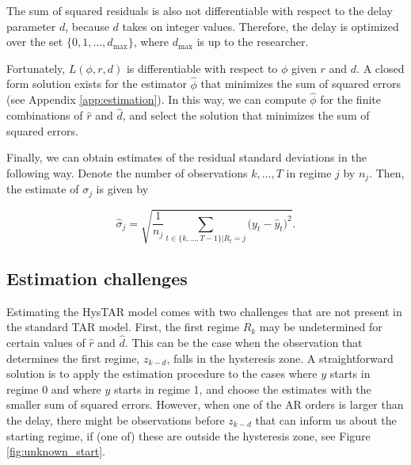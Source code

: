 \documentclass{article}
\begin{document}
The sum of squared residuals is also not differentiable with respect to the delay parameter $d$, because $d$ takes on integer values. Therefore, the delay is optimized over the set $\{0, 1, \dots, d_{\max}\}$, where $d_{\max}$ is up to the researcher.

Fortunately, $L(\phi, r, d)$ is differentiable with respect to $\phi$ given $r$ and $d$. A closed form solution exists for the estimator $\hat{\phi}$ that minimizes the sum of squared errors (see Appendix \ref{app:estimation}). 
In this way, we can compute $\hat{\phi}$ for the finite combinations of $\hat{r}$ and $\hat{d}$, and select the solution that minimizes the sum of squared errors.

Finally, we can obtain estimates of the residual standard deviations in the following way. Denote the number of observations $k, \dots, T$ in regime $j$ by $n_j$. Then, the estimate of $\sigma_{j}$ is given by

\begin{equation}
\hat{\sigma}_{j} = \sqrt{\frac{1}{n_j} \sum_{t \in \{k, \dots, T-1\}| R_t = j} \big(y_t - \hat{y}_t \big)^2}.
\end{equation} 

\subsection{Estimation challenges}
Estimating the HysTAR model comes with two challenges that are not present in the standard TAR model.
First, the first regime $R_k$ may be undetermined for certain values of $\hat{r}$ and $\hat{d}$. 
This can be the case when the observation that determines the first regime, $z_{k-d}$, falls in the hysteresis zone.
A straightforward solution is to apply the estimation procedure to the cases where $y$ starts in regime 0 and where $y$ starts in regime 1, and choose the estimates with the smaller sum of squared errors.
However, when one of the AR orders is larger than the delay, there might be observations before $z_{k-d}$ that can inform us about the starting regime, if (one of) these are outside the hysteresis zone, see Figure \ref{fig:unknown_start}.
\end{document}

